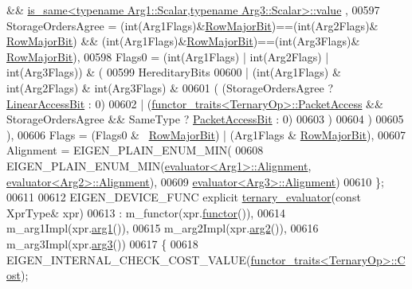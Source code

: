 \begin{DoxyCode}
       && \hyperlink{struct_eigen_1_1internal_1_1is__same}{is\_same<typename Arg1::Scalar,typename Arg3::Scalar>::value}
      ,
00597     StorageOrdersAgree = (int(Arg1Flags)&\hyperlink{group__flags_gae4f56c2a60bbe4bd2e44c5b19cbe8762}{RowMajorBit})==(\textcolor{keywordtype}{int}(Arg2Flags)&
      \hyperlink{group__flags_gae4f56c2a60bbe4bd2e44c5b19cbe8762}{RowMajorBit}) && (\textcolor{keywordtype}{int}(Arg1Flags)&\hyperlink{group__flags_gae4f56c2a60bbe4bd2e44c5b19cbe8762}{RowMajorBit})==(\textcolor{keywordtype}{int}(Arg3Flags)&
      \hyperlink{group__flags_gae4f56c2a60bbe4bd2e44c5b19cbe8762}{RowMajorBit}),
00598     Flags0 = (\textcolor{keywordtype}{int}(Arg1Flags) | int(Arg2Flags) | int(Arg3Flags)) & (
00599         HereditaryBits
00600         | (\textcolor{keywordtype}{int}(Arg1Flags) & \textcolor{keywordtype}{int}(Arg2Flags) & \textcolor{keywordtype}{int}(Arg3Flags) &
00601            ( (StorageOrdersAgree ? \hyperlink{group__flags_ga4b983a15d57cd55806df618ac544d09e}{LinearAccessBit} : 0)
00602            | (\hyperlink{struct_eigen_1_1internal_1_1functor__traits}{functor\_traits<TernaryOp>::PacketAccess} && 
      StorageOrdersAgree && SameType ? \hyperlink{group__flags_ga1a306a438e1ab074e8be59512e887b9f}{PacketAccessBit} : 0)
00603            )
00604         )
00605      ),
00606     Flags = (Flags0 & ~\hyperlink{group__flags_gae4f56c2a60bbe4bd2e44c5b19cbe8762}{RowMajorBit}) | (Arg1Flags & \hyperlink{group__flags_gae4f56c2a60bbe4bd2e44c5b19cbe8762}{RowMajorBit}),
00607     Alignment = EIGEN\_PLAIN\_ENUM\_MIN(
00608         EIGEN\_PLAIN\_ENUM\_MIN(\hyperlink{struct_eigen_1_1internal_1_1evaluator}{evaluator<Arg1>::Alignment}, 
      \hyperlink{struct_eigen_1_1internal_1_1evaluator}{evaluator<Arg2>::Alignment}),
00609         \hyperlink{struct_eigen_1_1internal_1_1evaluator}{evaluator<Arg3>::Alignment})
00610   \};
00611 
00612   EIGEN\_DEVICE\_FUNC \textcolor{keyword}{explicit} \hyperlink{struct_eigen_1_1internal_1_1ternary__evaluator}{ternary\_evaluator}(\textcolor{keyword}{const} XprType& xpr)
00613     : m\_functor(xpr.\hyperlink{group___core___module_acec526305dd83e6c0b3bd2cdbfd19307}{functor}()),
00614       m\_arg1Impl(xpr.\hyperlink{group___core___module_a37ec6f7c9b863f58a3e193cac44bdd82}{arg1}()), 
00615       m\_arg2Impl(xpr.\hyperlink{group___core___module_a271606675838696dd7660d4d847ae5f7}{arg2}()), 
00616       m\_arg3Impl(xpr.\hyperlink{group___core___module_aab71f401afd7ebc25428369c30151a1f}{arg3}())  
00617   \{
00618     EIGEN\_INTERNAL\_CHECK\_COST\_VALUE(\hyperlink{struct_eigen_1_1internal_1_1functor__traits}{functor\_traits<TernaryOp>::Cost});

\end{DoxyCode}
